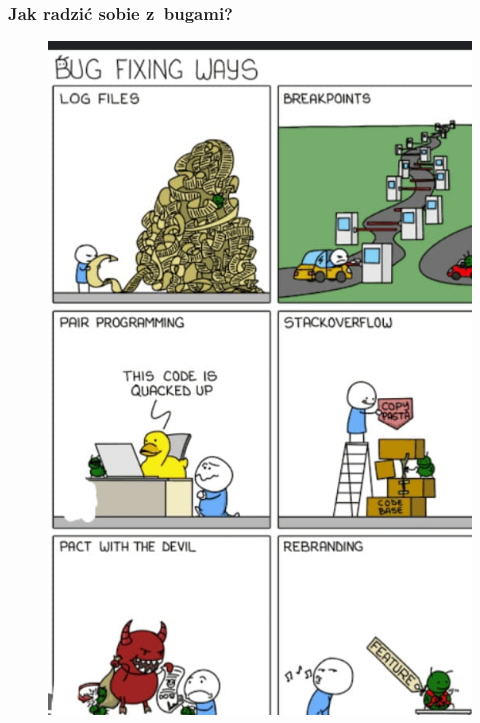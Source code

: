 \documentclass[10pt,t]{beamer}
\begin{document}
\begin{frame}
  \frametitle{Jak radzić sobie z~bugami?}


  \begin{figure}

    \centering


    \includegraphics[scale=0.24]
    {./PresentationsPictures/Ways-to-fix-a-bug.jpg}

  \end{figure}

\end{frame}
\end{document}
